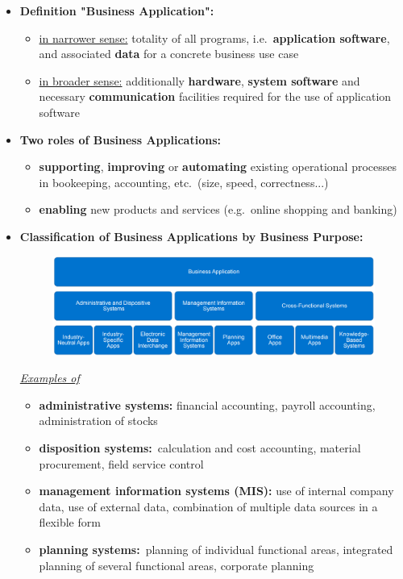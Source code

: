 \documentclass[ieeetran]{article}
\begin{document}
\begin{itemize}
  \item \textbf{Definition "Business Application":}
	  \begin{itemize}
	    \item \underline{in narrower sense:} totality of all programs, i.e.\ \textbf{application software}, and associated \textbf{data} for a concrete business use case
	    \item \underline{in broader sense:} additionally \textbf{hardware}, \textbf{system software} and necessary \textbf{communication} facilities required for the use of application software
	  \end{itemize}
\item \textbf{Two roles of Business Applications:}
	\begin{itemize}
	  \item \textbf{supporting}, \textbf{improving} or \textbf{automating} existing operational processes in bookeeping, accounting, etc.\ (size, speed, correctness...)
	\item \textbf{enabling} new products and services (e.g.\ online shopping and banking)
	\end{itemize}
\item \textbf{Classification of Business Applications by Business Purpose:}
	\begin{figure}[h!]
	  \centering
	  \includegraphics[width=0.5\linewidth]{classofba.png}
	  \label{fig:classofba_png}
	\end{figure}

\textit{\underline{Examples of}}

\begin{itemize}
  \item \textbf{administrative systems:} financial accounting, payroll accounting, administration of stocks
\item \textbf{disposition systems:}\ calculation and cost accounting, material procurement, field service control
\item \textbf{management information systems (MIS):} use of internal company data, use of external data, combination of multiple data sources in a flexible form
\item \textbf{planning systems:}\ planning of individual functional areas, integrated planning of several functional areas, corporate planning


\end{itemize}
\end{itemize}
\end{document}
